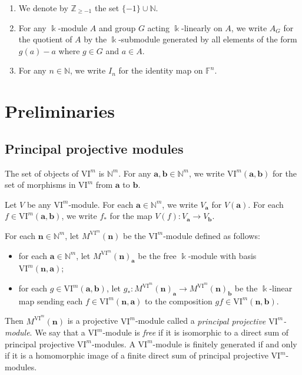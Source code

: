\documentclass{amsart}
\numberwithin{equation}{section}
\newcommand{\N}{{\mathbb{N}}}
\newcommand{\F}{{\mathbb{F}}}
\newcommand{\VI}{{\mathrm{VI}}}
\newcommand{\ZZ}{{\mathbb{Z}_{\geqslant -1}}}
\begin{document}
\begin{notation}
   \begin{enumerate}
      \item We denote by $\ZZ$ the set $\{-1\}\cup\N$. 

      \item For any $\Bbbk$-module $A$ and group $G$ acting $\Bbbk$-linearly on $A$, we write $A_G$ for the quotient of $A$ by the $\Bbbk$-submodule generated by all elements of the form $g(a) - a$ where $g\in G$ and $a\in A$. 
      
      \item For any $n\in \N$, we write $I_n$ for the identity map on $\F^n$.  
   \end{enumerate}

\end{notation}


\section{Preliminaries} \label{sec:prelim}

\subsection{Principal projective modules}
The set of objects of $\VI^m$ is $\N^m$. For any $\mathbf{a}, \mathbf{b}\in \N^m$, we write $\VI^m(\mathbf{a}, \mathbf{b})$ for the set of morphisms in $\VI^m$ from $\mathbf{a}$ to $\mathbf{b}$. 

Let $V$ be any $\VI^m$-module. For each $\mathbf{a}\in \N^m$, we write $V_{\mathbf{a}}$ for $V(\mathbf{a})$. For each $f\in \VI^m(\mathbf{a},\mathbf{b})$, we write $f_*$ for the map $V(f): V_{\mathbf{a}} \to V_{\mathbf{b}}$. 

For each $\mathbf{n}\in \N^m$, let $M^{\VI^m}(\mathbf{n})$ be the $\VI^m$-module defined as follows:
\begin{itemize}
   \item for each $\mathbf{a}\in \N^m$, let $M^{\VI^m}(\mathbf{n})_{\mathbf{a}}$ be the free $\Bbbk$-module with basis $\VI^m(\mathbf{n}, \mathbf{a})$;
   \item for each $g\in \VI^m(\mathbf{a}, \mathbf{b})$, let $g_*: M^{\VI^m}(\mathbf{n})_{\mathbf{a}} \to M^{\VI^m}(\mathbf{n})_{\mathbf{b}}$ be the $\Bbbk$-linear map sending each $f\in \VI^m(\mathbf{n}, \mathbf{a})$ to the composition $gf\in \VI^m(\mathbf{n},\mathbf{b})$.
\end{itemize}
Then $M^{\VI^m}(\mathbf{n})$ is a projective $\VI^m$-module called a \emph{principal projective $\VI^m$-module}. We say that a $\VI^m$-module is \emph{free} if it is isomorphic to a direct sum of principal projective $\VI^m$-modules. A $\VI^m$-module is finitely generated if and only if it is a homomorphic image of a finite direct sum of principal projective $\VI^m$-modules.
\end{document}
